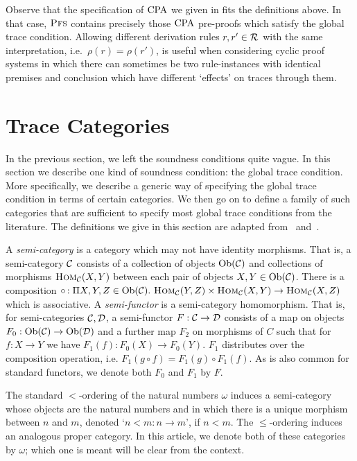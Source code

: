
Observe that the specification of $\mathrm{CPA}$ we given in  fits the
definitions above. In that case, $\textsc{Pfs}$ contains precisely those $\mathrm{CPA}$
pre-proofs which satisfy the global trace condition. Allowing different
derivation rules $r, r' \in \mathcal{R}$ with the same interpretation, i.e.\ $\rho(r) =
\rho(r')$, is useful when considering cyclic proof systems in which there can
sometimes be
two rule-instances with identical premises and conclusion
which have different `effects' on traces through them.

\section{Trace Categories}
\label{sec:tcs}

In the previous section, we left the soundness conditions quite vague. In this
section we describe one kind of soundness condition: the global trace condition.
More specifically, we describe a generic way of specifying the global trace
condition in terms of certain categories. We then go on to define a family of
such categories that are sufficient to specify most global trace conditions from
the literature. The definitions we give in this
section are adapted from~\cite{afshariAbstractCyclicProofs2022}
and~\cite{wehrAbstractFrameworkAnalysis2021}.

A \emph{semi-category} is a category which may not have identity morphisms.
That is, a semi-category $\mathcal{C}$ consists of a collection of objects $\mathrm{Ob}(\mathcal{C})$ 
and collections of morphisms  $\textsc{Hom}_{\mathcal{C}}(X, Y)$ between each pair of objects  $X, Y \in
\mathrm{Ob}(\mathcal{C})$. There is a composition
$\mathrel{\circ}\, : \Pi X, Y, Z \in \mathrm{Ob}(\mathcal{C}).~\textsc{Hom}_{\mathcal{C}}(Y, Z) \times \textsc{Hom}_{\mathcal{C}}(X,
Y) \to \textsc{Hom}_{\mathcal{C}}(X, Z)$ which is associative.
A \emph{semi-functor} is a semi-category homomorphism. That is, for
semi-categories $\mathcal{C}, \mathcal{D}$, a semi-functor $F : \mathcal{C} \to \mathcal{D}$ consists of a map
on objects $F_0 : \mathrm{Ob}(\mathcal{C}) \to \mathrm{Ob}(\mathcal{D})$ and a further map $F_2$ on
morphisms of $C$ such that for $f : X \to Y$ we have $F_1(f) : F_0(X)
\to F_0(Y)$.
$F_1$ distributes over the composition
operation, i.e. $F_1(g \circ f) = F_1(g) \circ F_1(f)$. As is also common for standard functors,
we denote both $F_0$ and $F_1$ by $F$.

The standard $<$-ordering of the natural numbers $\omega$ induces a semi-category whose
objects are the natural numbers and in which there is a unique morphism
between $n$ and $m$, denoted `$n < m : n \to m$', if $n < m$. The $\leq$-ordering
 induces an analogous proper category. In this article, we denote both of
these categories by $\omega$; which one is meant will
be clear from the context.

